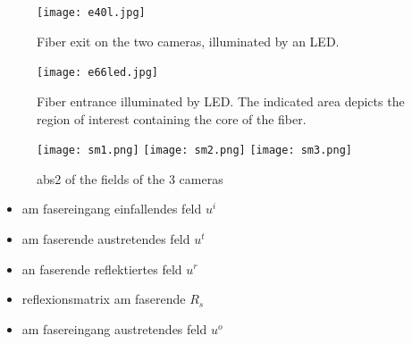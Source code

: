\documentclass{article}
\begin{document}
\begin{figure}[htbp]
  \centering
  \texttt{[image: e40l.jpg]}
  \caption{Fiber exit on the two cameras, illuminated by an LED.}
  \label{fig:e40}
\end{figure}

\begin{figure}[htbp]
  \centering
  \texttt{[image: e66led.jpg]}
  \caption{Fiber entrance illuminated by LED. The indicated area
    depicts the region of interest containing the core of the fiber.}
  \label{fig:e66}
\end{figure}

\begin{figure}[htbp]
  \centering
  \texttt{[image: sm1.png]}
  \texttt{[image: sm2.png]}
  \texttt{[image: sm3.png]}
  \caption{abs2 of the fields of the 3 cameras}
  \label{fig:mosaic}
\end{figure}


\begin{itemize}
\item am fasereingang einfallendes feld $u^i$
\item am faserende austretendes feld $u^t$
\item an faserende reflektiertes feld $u^r$
\item reflexionsmatrix am faserende $R_s$
\item am fasereingang austretendes feld $u^o$
\end{itemize}
\end{document}
